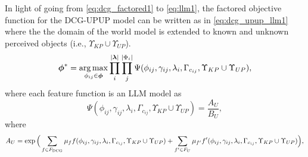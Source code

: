 In light of going from \eqref{eq:dcg_factored1} to \eqref{eq:llm1}, the factored objective function for the DCG-UPUP model can be written as in \eqref{eq:dcg_upup_llm1} where the the domain of the world model is extended to known and unknown perceived objects (i.e., $\Upsilon_{KP} \cup \Upsilon_{UP}$).
\begin{equation}
\boldsymbol{\phi}^* = \operatorname*{\arg\max}_{\phi_{ij} \in \boldsymbol{\phi}} \prod_{i}^{|\boldsymbol\lambda|} \prod_{j}^{|\Phi_i|} \Psi(\phi_{ij},\gamma_{ij},\lambda_i,\Gamma_{c_{ij}},\Upsilon_{KP} \cup \Upsilon_{UP}),
\label{eq:dcg_upup_llm1}
\end{equation}
where each feature function is an LLM model as
\begin{equation}
\Psi(\phi_{ij},\gamma_{ij},\lambda_i,\Gamma_{c_{ij}},\Upsilon_{KP} \cup \Upsilon_{UP}) = \frac{A_U}{B_U},
\label{eq:dcg_upup_llm2}
\end{equation}
where
\begin{equation}
A_U= \exp \Big( \sum_{f \in F_{\text{DCG}}} \mu_f f(\phi_{ij},\gamma_{ij},\lambda_i,\Gamma_{c_{ij}},\Upsilon_{KP} \cup \Upsilon_{UP}) \nonumber \\
+ \sum_{f^\prime \in F_{U}} \mu_{f^\prime} f^\prime(\phi_{ij},\gamma_{ij},\lambda_i,\Gamma_{c_{ij}},\Upsilon_{KP} \cup \Upsilon_{UP}) \Big) \nonumber,
\end{equation}

